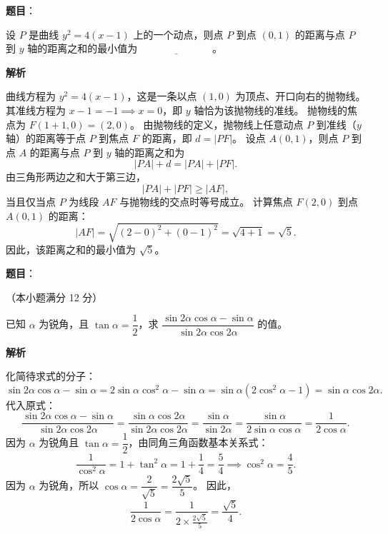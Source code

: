 \begin{answer}

\textbf{题目}：

设 $P$ 是曲线 $y^2=4(x-1)$ 上的一个动点，则点 $P$ 到点 $(0,1)$ 的距离与点 $P$ 到 $y$ 轴的距离之和的最小值为 $\underline{\hspace{3cm}}$。

\textbf{解析}

曲线方程为 $y^2=4(x-1)$，这是一条以点 $(1,0)$ 为顶点、开口向右的抛物线。
其准线方程为 $x-1=-1 \implies x=0$，即 $y$ 轴恰为该抛物线的准线。
抛物线的焦点为 $F(1+1,0)=(2,0)$。
由抛物线的定义，抛物线上任意动点 $P$ 到准线（$y$ 轴）的距离等于点 $P$ 到焦点 $F$ 的距离，即 $d=|PF|$。
设点 $A(0,1)$，则点 $P$ 到点 $A$ 的距离与点 $P$ 到 $y$ 轴的距离之和为
\nopagebreak[4]
\[
|PA|+d=|PA|+|PF|.
\]
由三角形两边之和大于第三边，
\nopagebreak[4]
\[
|PA|+|PF|\geqslant |AF|,
\]
当且仅当点 $P$ 为线段 $AF$ 与抛物线的交点时等号成立。
计算焦点 $F(2,0)$ 到点 $A(0,1)$ 的距离：
\nopagebreak[4]
\[
|AF|=\sqrt{(2-0)^2+(0-1)^2}=\sqrt{4+1}=\sqrt{5}.
\]
因此，该距离之和的最小值为 $\sqrt{5}$。


\end{answer}
\begin{answer}

\textbf{题目}：

（本小题满分 12 分）

已知 $\alpha$ 为锐角，且 $\tan\alpha=\dfrac{1}{2}$，求 $\dfrac{\sin 2\alpha\cos\alpha-\sin\alpha}{\sin 2\alpha\cos 2\alpha}$ 的值。

\textbf{解析}

化简待求式的分子：
\nopagebreak[4]
\[
\sin 2\alpha\cos\alpha-\sin\alpha=2\sin\alpha\cos^2\alpha-\sin\alpha=\sin\alpha(2\cos^2\alpha-1)=\sin\alpha\cos 2\alpha.
\]
代入原式：
\nopagebreak[4]
\[
\frac{\sin 2\alpha\cos\alpha-\sin\alpha}{\sin 2\alpha\cos 2\alpha}=\frac{\sin\alpha\cos 2\alpha}{\sin 2\alpha\cos 2\alpha}=\frac{\sin\alpha}{\sin 2\alpha}=\frac{\sin\alpha}{2\sin\alpha\cos\alpha}=\frac{1}{2\cos\alpha}.
\]
因为 $\alpha$ 为锐角且 $\tan\alpha=\dfrac{1}{2}$，由同角三角函数基本关系式：
\nopagebreak[4]
\[
\frac{1}{\cos^2\alpha}=1+\tan^2\alpha=1+\frac{1}{4}=\frac{5}{4} \implies \cos^2\alpha=\frac{4}{5}.
\]
因为 $\alpha$ 为锐角，所以 $\cos\alpha=\dfrac{2}{\sqrt{5}}=\dfrac{2\sqrt{5}}{5}$。
因此，
\nopagebreak[4]
\[
\frac{1}{2\cos\alpha}=\frac{1}{2\times\frac{2\sqrt{5}}{5}}=\frac{\sqrt{5}}{4}.
\]


\end{answer}
